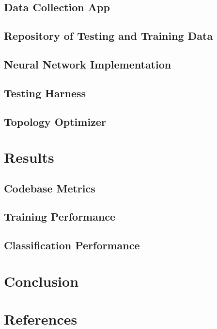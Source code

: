 \documentclass{article}
\begin{document}
\subsection{Data Collection App}

\subsection{Repository of Testing and Training Data}

\subsection{Neural Network Implementation}

\subsection{Testing Harness}

\subsection{Topology Optimizer}


\section{Results}

\subsection{Codebase Metrics}


\subsection{Training Performance}


\subsection{Classification Performance}


\section{Conclusion}


\section{References}

\printbibliography
\end{document}
